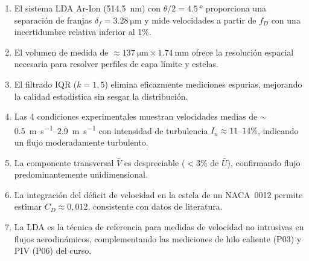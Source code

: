 \documentclass[12pt,a4paper]{article}
\begin{document}
\begin{enumerate}
	\item El sistema LDA Ar-Ion (\SI{514,5}{\nm}) con
	      $\theta/2 = \SI{4,5}{\degree}$ proporciona una separación de
	      franjas $\delta_f = \SI{3,28}{\micro\m}$ y mide velocidades a
	      partir de $f_D$ con una incertidumbre relativa inferior al 1\%.
	\item El volumen de medida de $\approx\SI{137}{\micro\m}\times
		      \SI{1,74}{\mm}$ ofrece la resolución espacial necesaria para
	      resolver perfiles de capa límite y estelas.
	\item El filtrado IQR ($k = 1{,}5$) elimina eficazmente mediciones
	      espurias, mejorando la calidad estadística sin sesgar la
	      distribución.
	\item Las 4 condiciones experimentales muestran velocidades medias de
	      $\sim$\SIrange{0,5}{2,9}{\m\per\s} con intensidad de turbulencia
	      $I_u \approx 11$--$14\%$, indicando un flujo moderadamente
	      turbulento.
	\item La componente transversal $\bar{V}$ es despreciable ($< 3\%$ de
	      $\bar{U}$), confirmando flujo predominantemente unidimensional.
	\item La integración del déficit de velocidad en la estela de un
	      NACA~0012 permite estimar $C_D \approx 0{,}012$, consistente con
	      datos de literatura.
	\item La LDA es la técnica de referencia para medidas de velocidad no
	      intrusivas en flujos aerodinámicos, complementando las mediciones
	      de hilo caliente (P03) y PIV (P06) del curso.
\end{enumerate}

\printbibliography[title={Referencias}]
\end{document}
